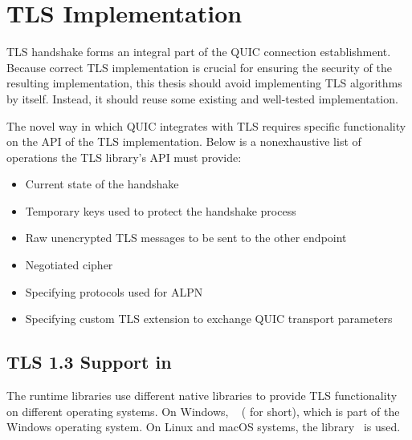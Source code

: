 \section{TLS Implementation}

TLS handshake forms an integral part of the QUIC connection establishment. Because correct TLS
implementation is crucial for ensuring the security of the resulting implementation, this thesis
should avoid implementing TLS algorithms by itself. Instead, it should reuse some existing and
well-tested implementation.

The novel way in which QUIC integrates with TLS requires specific functionality on the API of the
TLS implementation. Below is a nonexhaustive list of operations the TLS library's API must provide:

\begin{itemize}

  \item Current state of the handshake

  \item Temporary keys used to protect the handshake process

  \item Raw unencrypted TLS messages to be sent to the other endpoint

  \item Negotiated cipher

  \item Specifying protocols used for ALPN

  \item Specifying custom TLS extension to exchange QUIC transport parameters

\end{itemize}

\subsection{TLS 1.3 Support in \dotnet{}}

The \dotnet{} runtime libraries use different native libraries to provide TLS functionality on
different operating systems. On Windows, ~\cite{Schannel} (\libschannel{}
for short), which is part of the Windows operating system. On Linux and macOS systems, the
\libopenssl{} library~\cite{OpenSSLWeb} is used.

